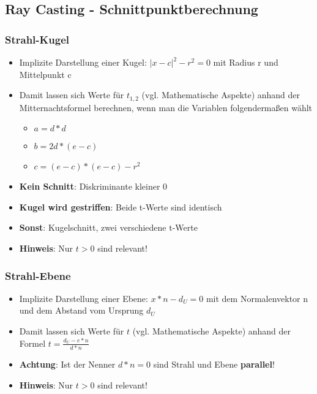 \documentclass[10pt,a4paper]{article}
\begin{document}
	\newpage
	\subsection{Ray Casting - Schnittpunktberechnung}
	\label{sub:ray_casting_schnittpunktberechnung}

	\subsubsection{Strahl-Kugel}
	\label{ssub:strahl_kugel}

	\begin{itemize}
		\item Implizite Darstellung einer Kugel: $|x - c|^2 - r^2 = 0$ mit Radius r und Mittelpunkt c
		\item Damit lassen sich Werte für $t_{1,2}$ (vgl. Mathematische Aspekte) anhand der Mitternachtsformel berechnen, wenn man die Variablen folgendermaßen wählt
		\begin{itemize}
			\item $a = d * d$
			\item $b = 2d * (e - c)$
			\item $c = (e - c) * (e - c) - r^2$
		\end{itemize}
		\item \textbf{Kein Schnitt}: Diskriminante kleiner 0
		\item \textbf{Kugel wird gestriffen}: Beide t-Werte sind identisch
		\item \textbf{Sonst}: Kugelschnitt, zwei verschiedene t-Werte
		\item \textbf{Hinweis}: Nur $t > 0$ sind relevant!
	\end{itemize}

	\subsubsection{Strahl-Ebene}
	\label{ssub:strahl_ebene}
	
	\begin{itemize}
		\item Implizite Darstellung einer Ebene: $x * n - d_U = 0$ mit dem Normalenvektor n und dem Abstand vom Ursprung $d_U$
		\item Damit lassen sich Werte für $t$ (vgl. Mathematische Aspekte) anhand der Formel $t = \frac{d_U - e * n}{d * n}$
		\item \textbf{Achtung}: Ist der Nenner $d * n = 0$ sind Strahl und Ebene \textbf{parallel}!
		\item \textbf{Hinweis}: Nur $t > 0$ sind relevant!
	\end{itemize}
\end{document}
